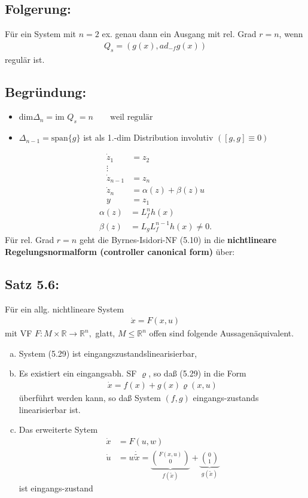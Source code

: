 \documentclass[ngerman]{tudscrreprt}
\begin{document}
\subsection*{Folgerung:}Für ein System mit $n=2$ ex. genau dann ein Ausgang mit rel. Grad $r=n$, wenn \begin{align*}
Q_s = (g(x), ad_{-f}g(x))
\end{align*} regulär ist.
\subsection*{Begründung:} 
\begin{itemize}
\item dim$ \Delta_n = \text{im } Q_s = n \qquad \text{weil regulär}$
\item $\Delta_{n-1} = \text{span} \{ g\} $ ist als 1.-dim Distribution involutiv $([g,g]\equiv 0)$
\end{itemize}
\begin{align*}
\dot z_1 &= z_2\\ 
\vdots\\ 
\dot z_{n-1} &= z_n\\ 
\dot z_{n} &= \alpha(z) + \beta(z)u\\ 
y &= z_1 \tag{5.28}
\end{align*}
\begin{align*}
\alpha(z) &= L_f^n h(x)\\ 
\beta(z) &= L_g L_f^{n-1}h(x) \ne 0.
\end{align*}
Für rel. Grad $r=n$ geht die Byrnes-Isidori-NF (5.10) in die \textbf{nichtlineare Regelungsnormalform (controller canonical form)} über:
\subsection*{Satz 5.6:} Für ein allg. nichtlineare System \begin{align*} \dot x = F(x, u) \tag{5.29} \end{align*} mit VF $F: M\times \mathbb{R} \to \mathbb{R}^n,$ glatt, $M \le \mathbb{R}^n $ offen sind folgende Aussagenäquivalent.
\begin{enumerate}[(a)]
\item System (5.29) ist eingangszustandslinearisierbar,
\item Es existiert ein eingangsabh. SF $\varrho$, so daß (5.29) in die Form \begin{align*} \dot x = f(x) + g(x)\varrho(x,u) \end{align*}
überführt werden kann, so daß System $(f,g)$ eingangs-zustands linearisierbar ist.


\item Das erweiterte Sytem \begin{align*}
\dot x &= F(u,w)\\ 
\dot u &= w
\dot{\tilde x} = \underbrace{\binom{F(x,u)}{0}}_{f(\tilde x)} + \underbrace{\binom{0}{1}}_{g(\tilde x)}
\end{align*}ist eingangs-zustand


\end{enumerate}
\end{document}
